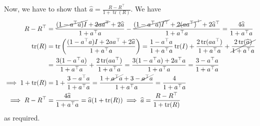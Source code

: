 Now, we have to show that \( \widehat{a} = \frac{R - R^{\top}}{1 + \operatorname{tr}(R)} \).
We have
\begin{align*}
    R - R^\top
     & =
    \frac{\cancel{(1 - a^{\top} a) I} + \cancel{2 a a^{\top}} + 2 \widehat{a}}{1 + a^{\top} a} - \frac{\cancel{(1 - a^{\top} a) I^\top} + \cancel{2 {(a a^{\top})}^\top} + 2 \widehat{a}^\top}{1 + a^{\top} a}
    =
    \frac{4 \widehat{a}}{1 + a^{\top} a}
    \\
    \operatorname{tr}(R)
     & =
    \operatorname{tr}\left( \frac{(1 - a^{\top} a) I + 2 a a^{\top} + 2 \widehat{a}}{1 + a^{\top} a} \right)
    =
    \frac{1 - a^{\top} a}{1 + a^{\top} a} \operatorname{tr}(I) + \frac{2 \operatorname{tr}(a a^{\top})}{1 + a^{\top} a} + \cancel{\frac{2 \operatorname{tr}(\widehat{a})}{1 + a^{\top} a}}
    \\ & =
    \frac{3 (1 - a^{\top} a)}{1 + a^{\top} a} + \frac{2 \operatorname{tr}(a a^{\top})}{1 + a^{\top} a}
    =
    \frac{3 (1 - a^{\top} a) + 2 a^{\top} a}{1 + a^{\top} a}
    =
    \frac{3 - a^{\top} a}{1 + a^{\top} a}
    \\
    \implies
    1 + \operatorname{tr}(R)
     & =
    1 + \frac{3 - a^{\top} a}{1 + a^{\top} a}
    =
    \frac{1 + \cancel{a^{\top} a} + 3 - \cancel{a^{\top} a}}{1 + a^{\top} a}
    =
    \frac{4}{1 + a^{\top} a}
    \\
    \implies
    R - R^\top
     & =
    \frac{4 \widehat{a}}{1 + a^{\top} a}
    =
    \widehat{a} (1 + \operatorname{tr}(R))
    \implies
    \widehat{a}
    =
    \frac{R - R^\top}{1 + \operatorname{tr}(R)}
\end{align*}
as required.
